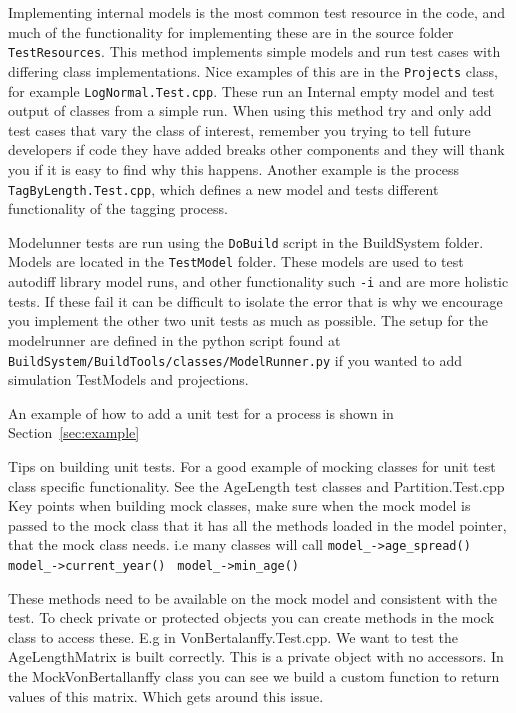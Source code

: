 Implementing internal models is the most common test resource in the code, and much of the functionality for implementing these are in the source folder \texttt{TestResources}. This method implements simple models and run test cases with differing class implementations. Nice examples of this are in the \texttt{Projects} class, for example \texttt{LogNormal.Test.cpp}. These run an Internal empty model and test output of classes from a simple run. When using this method try and only add test cases that vary the class of interest, remember you trying to tell future developers if code they have added breaks other components and they will thank you if it is easy to find why this happens. Another example is the process \texttt{TagByLength.Test.cpp}, which defines a new model and tests different functionality of the tagging process.


Modelunner tests are run using the \texttt{DoBuild} script in the BuildSystem folder. Models are located in the \texttt{TestModel} folder. These models are used to test autodiff library model runs, and other functionality such \texttt{-i} and are more holistic tests. If these fail it can be difficult to isolate the error that is why we encourage you implement the other two unit tests as much as possible. The setup for the modelrunner are defined in the python script found at \texttt{BuildSystem/BuildTools/classes/ModelRunner.py} if you wanted to add simulation TestModels and projections.


An example of how to add a unit test for a process is shown in Section~\ref{sec:example}


Tips on building unit tests. For a good example of mocking classes for unit test class specific functionality. See the AgeLength test classes and Partition.Test.cpp Key points when building mock classes, make sure when the mock model is passed to the mock class that it has all the methods loaded in the model pointer, that the mock class needs. i.e many classes will call 
\texttt{model\_->age\_spread()}
\texttt{model\_->current\_year() }
\texttt{model\_->min\_age()}

These methods need to be available on the mock model and consistent with the test. To check private or protected objects you can create methods in the mock class to access these. E.g in VonBertalanffy.Test.cpp. We want to test the AgeLengthMatrix is built correctly. This is a private object with no accessors. In the MockVonBertallanffy class you can see we build a custom function to return values of this matrix. Which gets around this issue.


